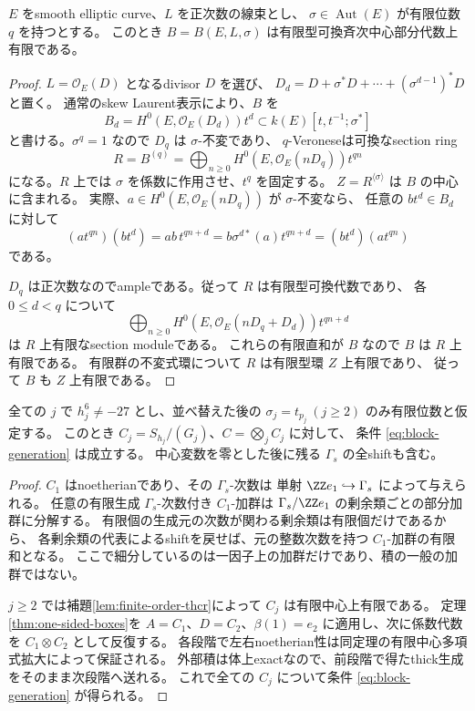 \begin{lemma}[有限位数THCRの有限中心性]\label{lem:finite-order-thcr}
 \(E\) をsmooth elliptic curve、\(L\) を正次数の線束とし、
 \(\sigma\in\operatorname{Aut}(E)\) が有限位数 \(q\) を持つとする。
 このとき \(B=B(E,L,\sigma)\) は有限型可換斉次中心部分代数上有限である。
\end{lemma}
\begin{proof}
 \(L=\mathcal O_E(D)\) となるdivisor \(D\) を選び、
 \(D_d=D+\sigma^*D+\cdots+(\sigma^{d-1})^*D\) と置く。
 通常のskew Laurent表示により、\(B\) を
 \[
 B_d=H^0(E,\mathcal O_E(D_d))t^d
 \subset k(E)[t,t^{-1};\sigma^*]
 \]
 と書ける。\(\sigma^q=1\) なので \(D_q\) は \(\sigma\)-不変であり、
 \(q\)-Veroneseは可換なsection ring
 \[
 R=B^{(q)}=\bigoplus_{n\ge0}H^0(E,\mathcal O_E(nD_q))t^{qn}
 \]
 になる。\(R\) 上では \(\sigma\) を係数に作用させ、\(t^q\) を固定する。
 \(Z=R^{\langle\sigma\rangle}\) は \(B\) の中心に含まれる。
 実際、\(a\in H^0(E,\mathcal O_E(nD_q))\) が \(\sigma\)-不変なら、
 任意の \(bt^d\in B_d\) に対して
 \[
 (at^{qn})(bt^d)=ab\,t^{qn+d}
 =b\sigma^{d*}(a)t^{qn+d}=(bt^d)(at^{qn})
 \]
 である。

 \(D_q\) は正次数なのでampleである。従って \(R\) は有限型可換代数であり、
 各 \(0\le d<q\) について
 \[
 \bigoplus_{n\ge0}H^0(E,\mathcal O_E(nD_q+D_d))t^{qn+d}
 \]
 は \(R\) 上有限なsection moduleである。
 これらの有限直和が \(B\) なので \(B\) は \(R\) 上有限である。
 有限群の不変式環について \(R\) は有限型環 \(Z\) 上有限であり、
 従って \(B\) も \(Z\) 上有限である。
\end{proof}




\begin{corollary}[一つの任意位数因子を含む生成条件]\label{cor:PI-generation}
 全ての \(j\) で \(h_j^6\ne-27\) とし、並べ替えた後の
 \(\sigma_j=t_{p_j}\ (j\ge2)\) のみ有限位数と仮定する。
 このとき \(C_j=S_{h_j}/(G_j)\)、\(C=\bigotimes_jC_j\) に対して、
 条件 \eqref{eq:block-generation} は成立する。
 中心変数を零とした後に残る \(\Gamma_s\) の全shiftも含む。
\end{corollary}
\begin{proof}
 \(C_1\) はnoetherianであり、その \(\Gamma_s\)-次数は
 単射 \(\ZZ e_1\hookrightarrow\Gamma_s\) によって与えられる。
 任意の有限生成 \(\Gamma_s\)-次数付き \(C_1\)-加群は
 \(\Gamma_s/\ZZ e_1\) の剰余類ごとの部分加群に分解する。
 有限個の生成元の次数が関わる剰余類は有限個だけであるから、
 各剰余類の代表によるshiftを戻せば、元の整数次数を持つ \(C_1\)-加群の有限和となる。
 ここで細分しているのは一因子上の加群だけであり、積の一般の加群ではない。

 \(j\ge2\) では補題\ref{lem:finite-order-thcr}によって \(C_j\) は有限中心上有限である。
 定理\ref{thm:one-sided-boxes}を
 \(A=C_1\)、\(D=C_2\)、\(\beta(1)=e_2\) に適用し、次に係数代数を
 \(C_1\otimes C_2\) として反復する。
 各段階で左右noetherian性は同定理の有限中心多項式拡大によって保証される。
 外部積は体上exactなので、前段階で得たthick生成をそのまま次段階へ送れる。
 これで全ての \(C_j\) について条件 \eqref{eq:block-generation} が得られる。
\end{proof}

